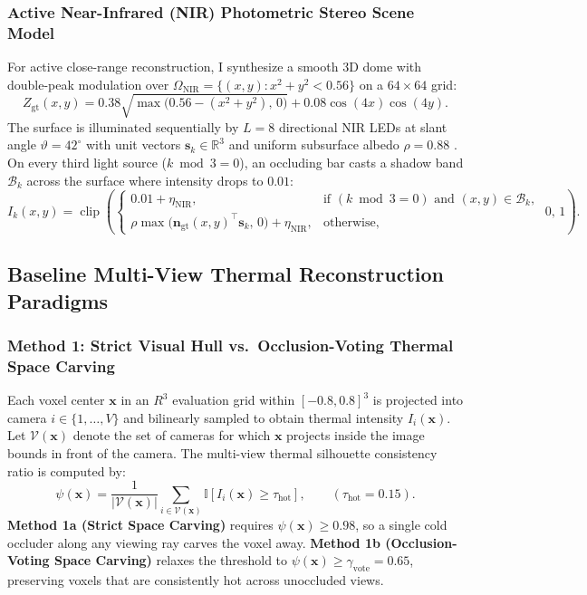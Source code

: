 \documentclass[12pt,letterpaper]{article}
\begin{document}
\subsubsection{Active Near-Infrared (NIR) Photometric Stereo Scene Model}
For active close-range reconstruction, I synthesize a smooth 3D dome with double-peak modulation over $\Omega_{\text{NIR}} = \{(x, y) : x^2 + y^2 < 0.56\}$ on a $64 \times 64$ grid:
\begin{equation}
  Z_{\text{gt}}(x, y) = 0.38\sqrt{\max\!\big(0.56 - (x^2 + y^2),\, 0\big)} + 0.08\cos(4x)\cos(4y).
  \label{eq:nir_heightmap}
\end{equation}
The surface is illuminated sequentially by $L = 8$ directional NIR LEDs at slant angle $\vartheta = 42^\circ$ with unit vectors $\mathbf{s}_k \in \mathbb{R}^3$ and uniform subsurface albedo $\rho = 0.88$ \cite{hansen2010nir}. On every third light source ($k \bmod 3 = 0$), an occluding bar casts a shadow band $\mathcal{B}_k$ across the surface where intensity drops to $0.01$:
\begin{equation}
  I_k(x, y) = \operatorname{clip}\!\left(
    \begin{cases}
      0.01 + \eta_{\text{NIR}}, & \text{if } (k \bmod 3 = 0) \text{ and } (x, y) \in \mathcal{B}_k, \\[2pt]
      \rho \max\!\big(\mathbf{n}_{\text{gt}}(x, y)^\top \mathbf{s}_k,\, 0\big) + \eta_{\text{NIR}}, & \text{otherwise},
    \end{cases}
  \; 0,\, 1\right).
  \label{eq:nir_model}
\end{equation}

\subsection{Baseline Multi-View Thermal Reconstruction Paradigms}

\subsubsection{Method 1: Strict Visual Hull vs.\ Occlusion-Voting Thermal Space Carving}
Each voxel center $\mathbf{x}$ in an $R^3$ evaluation grid within $[-0.8, 0.8]^3$ is projected into camera $i \in \{1, \dots, V\}$ and bilinearly sampled to obtain thermal intensity $I_i(\mathbf{x})$. Let $\mathcal{V}(\mathbf{x})$ denote the set of cameras for which $\mathbf{x}$ projects inside the image bounds in front of the camera. The multi-view thermal silhouette consistency ratio is computed by:
\begin{equation}
  \psi(\mathbf{x}) = \frac{1}{|\mathcal{V}(\mathbf{x})|} \sum_{i \in \mathcal{V}(\mathbf{x})} \mathbb{I}\!\left[I_i(\mathbf{x}) \ge \tau_{\text{hot}}\right], \qquad (\tau_{\text{hot}} = 0.15).
  \label{eq:space_carving_ratio}
\end{equation}
\textbf{Method 1a (Strict Space Carving)} requires $\psi(\mathbf{x}) \ge 0.98$, so a single cold occluder along any viewing ray carves the voxel away. \textbf{Method 1b (Occlusion-Voting Space Carving)} relaxes the threshold to $\psi(\mathbf{x}) \ge \gamma_{\text{vote}} = 0.65$, preserving voxels that are consistently hot across unoccluded views.
\end{document}
